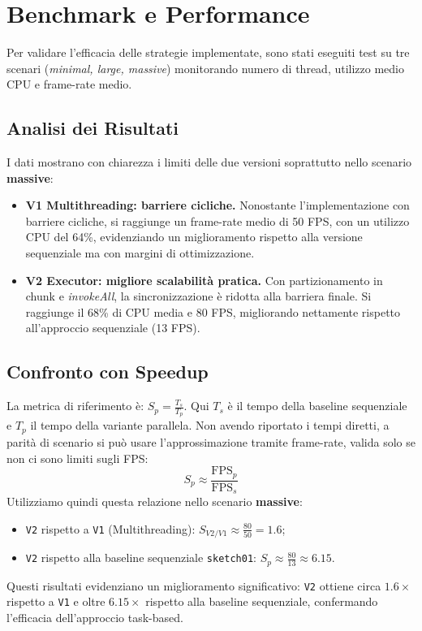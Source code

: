 \section{Benchmark e Performance}
Per validare l'efficacia delle strategie implementate, sono stati eseguiti test su tre scenari (\emph{minimal, large, massive}) monitorando numero di thread, utilizzo medio CPU e frame-rate medio.



\subsection{Analisi dei Risultati}
\label{sec:benchmark_risultati}
I dati mostrano con chiarezza i limiti delle due versioni soprattutto nello scenario \textbf{massive}:
\begin{itemize}
    \item \textbf{V1 Multithreading: barriere cicliche.} Nonostante l'implementazione con barriere cicliche, si raggiunge un frame-rate medio di 50 FPS, con un utilizzo CPU del 64\%, evidenziando un miglioramento rispetto alla versione sequenziale ma con margini di ottimizzazione.
    
    \item \textbf{V2 Executor: migliore scalabilità pratica.} Con partizionamento in chunk e \emph{invokeAll}, la sincronizzazione è ridotta alla barriera finale. Si raggiunge il 68\% di CPU media e 80 FPS, migliorando nettamente rispetto all'approccio sequenziale (13 FPS).
\end{itemize}

\newpage
\subsection{Confronto con Speedup}
La metrica di riferimento è: $ S_p = \frac{T_s}{T_p} $. 
Qui $T_s$ è il tempo della baseline sequenziale e $T_p$ il tempo della variante parallela. Non avendo riportato i tempi diretti, a parità di scenario si può usare l'approssimazione tramite frame-rate, valida solo se non ci sono limiti sugli FPS:
\[ S_p \approx \frac{\text{FPS}_p}{\text{FPS}_s} \]
Utilizziamo quindi questa relazione nello scenario \textbf{massive}:
\begin{itemize}
    \item \texttt{V2} rispetto a \texttt{V1} (Multithreading): $S_{V2/V1} \approx \frac{80}{50} = 1.6 $;
    \item \texttt{V2} rispetto alla baseline sequenziale \texttt{sketch01}: $S_p \approx \frac{80}{13} \approx 6.15 $.
\end{itemize}
Questi risultati evidenziano un miglioramento significativo: \texttt{V2} ottiene circa $1.6\times$ rispetto a \texttt{V1} e oltre $6.15\times$ rispetto alla baseline sequenziale, confermando l'efficacia dell'approccio task-based.